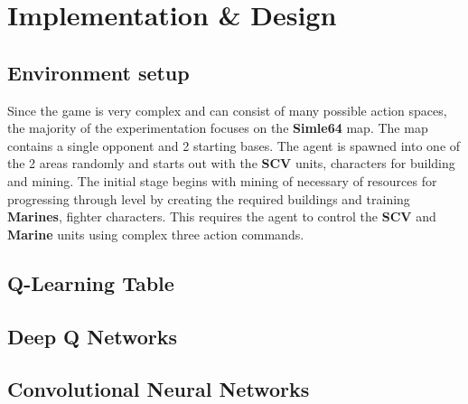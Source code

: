 \chapter{Implementation \& Design}%
\label{implem}
\section{Environment setup}
Since the game is very complex and can consist of many possible action spaces, the majority of the experimentation focuses on the \textbf{Simle64} map. The map contains a single opponent and 2 starting bases. The agent is spawned into one of the 2 areas randomly and starts out with the \textbf{SCV} units, characters for building and mining. The initial stage begins with mining of necessary of resources for progressing through level by creating the required buildings and training \textbf{Marines}, fighter characters. This requires the agent to control the \textbf{SCV} and \textbf{Marine} units using complex three action commands.

\section{Q-Learning Table}


\section{Deep Q Networks}


\section{Convolutional Neural Networks}